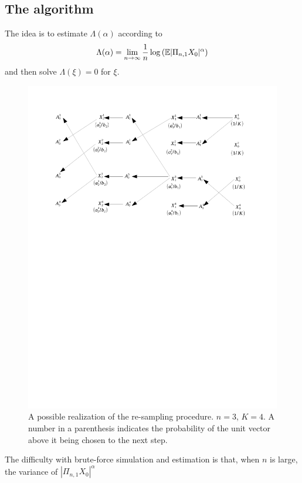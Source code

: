 \subsection{The algorithm}
The idea is to estimate $\Lambda(\alpha)$ according to
\begin{equation}
  \label{eq:Lambda}
  \Lambda(\alpha) = \lim_{n \to \infty}{1 \over n} \log \left(
    \mathbb{E} |\Pi_{n, 1} X_0|^\alpha
  \right)
\end{equation}
and then solve $\Lambda(\xi) = 0$ for $\xi$.
\begin{figure}[htb!]
  \centering
  \includegraphics[width=\linewidth, trim=2cm 16cm 2.5cm 2cm, clip]{AnandsEstimator.pdf}
  \caption{A possible realization of the re-sampling procedure. $n =
    3$, $K = 4$. A number in a parenthesis indicates the probability
    of the unit vector above it being chosen to the next step.}
  \label{fig:AnandsEstimator}
\end{figure}
The difficulty with brute-force simulation and estimation is that,
when $n$ is large, the variance of $|\Pi_{n, 1} X_0|^\alpha$
